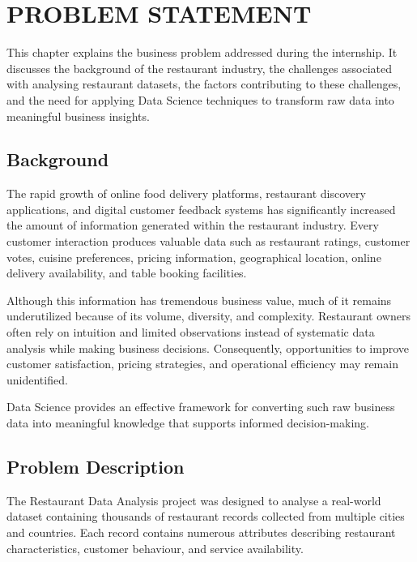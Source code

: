 \documentclass[12pt,a4paper]{report}
\begin{document}
\chapter{PROBLEM STATEMENT}

This chapter explains the business problem addressed during the internship. It discusses the background of the restaurant industry, the challenges associated with analysing restaurant datasets, the factors contributing to these challenges, and the need for applying Data Science techniques to transform raw data into meaningful business insights.


\section{Background}

The rapid growth of online food delivery platforms, restaurant discovery applications, and digital customer feedback systems has significantly increased the amount of information generated within the restaurant industry. Every customer interaction produces valuable data such as restaurant ratings, customer votes, cuisine preferences, pricing information, geographical location, online delivery availability, and table booking facilities.

Although this information has tremendous business value, much of it remains underutilized because of its volume, diversity, and complexity. Restaurant owners often rely on intuition and limited observations instead of systematic data analysis while making business decisions. Consequently, opportunities to improve customer satisfaction, pricing strategies, and operational efficiency may remain unidentified.

Data Science provides an effective framework for converting such raw business data into meaningful knowledge that supports informed decision-making.


\section{Problem Description}

The Restaurant Data Analysis project was designed to analyse a real-world dataset containing thousands of restaurant records collected from multiple cities and countries. Each record contains numerous attributes describing restaurant characteristics, customer behaviour, and service availability.
\end{document}
